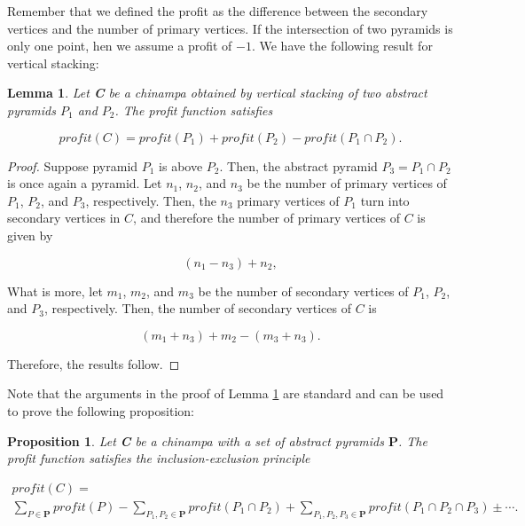 \documentclass[a4paper]{article}\usepackage[english]{babel}
\newtheorem{lemma}[theorem]{Lemma}
\newtheorem{proposition}[theorem]{Proposition}
\theoremstyle{definition}
\renewcommand{\emph}[1]{\textbf{#1}}
\begin{document}
Remember that we defined the profit as the difference between the secondary vertices and the number of primary vertices. If the intersection of two pyramids is only one point, hen we assume a profit of $-1$. We have the following result for vertical stacking:


\begin{lemma}\label{lemma:inclusion-exclusion}
Let \emph{C} be a chinampa obtained by vertical stacking of two abstract pyramids $P_1$ and $P_2$. The profit function satisfies

\begin{equation*}\label{eqn:iel}
 profit(C)=profit(P_1)+profit(P_2)-profit(P_1\cap P_2).
\end{equation*}
\end{lemma}

\begin{proof}
Suppose pyramid $P_1$ is above $P_2$. Then, the abstract pyramid $P_3=P_1\cap P_2$ is once again a pyramid. Let $n_1$, $n_2$, and $n_3$ be the number of primary vertices of $P_1$, $P_2$, and $P_3$, respectively. Then, the $n_3$ primary vertices of $P_1$ turn into secondary vertices in $C$, and therefore the number of primary vertices of $C$ is given by 

\begin{equation*}
(n_1-n_3)+n_2,
\end{equation*}

What is more, let $m_1$, $m_2$, and $m_3$ be the number of secondary vertices of $P_1$, $P_2$, and $P_3$, respectively. Then, the number of secondary vertices of $C$ is 

\begin{equation*}
(m_1+n_3)+m_2-(m_3+n_3).
\end{equation*}

Therefore, the results follow.
\end{proof}

Note that the arguments in the proof of Lemma \ref{lemma:inclusion-exclusion} are standard and can be used to prove the following proposition:

\begin{proposition}\label{prop:ie}
Let \emph{C} be a chinampa with a set of abstract pyramids $\mathbf{P}$. The profit function satisfies the inclusion-exclusion principle

\begin{multline}\label{eqn:ie}
 profit(C)=\\
\sum_{P\in\mathbf{P}}  profit(P)-\sum_{P_1,P_2\in\mathbf{P}} profit(P_1\cap P_2)
+\sum_{P_1,P_2,P_3\in\mathbf{P}}  profit(P_1\cap P_2\cap P_3)\pm \cdots.
\end{multline}
\end{proposition}
\end{document}
